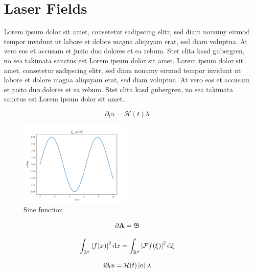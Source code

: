 \section{Laser Fields}
Lorem ipsum dolor sit amet, consetetur sadipscing elitr, sed diam nonumy eirmod tempor invidunt ut labore et dolore magna aliquyam erat, sed diam voluptua. At vero eos et accusam et justo duo dolores et ea rebum. Stet clita kasd gubergren, no sea takimata sanctus est Lorem ipsum dolor sit amet. Lorem ipsum dolor sit amet, consetetur sadipscing elitr, sed diam nonumy eirmod tempor invidunt ut labore et dolore magna aliquyam erat, sed diam voluptua. At vero eos et accusam et justo duo dolores et ea rebum. Stet clita kasd gubergren, no sea takimata sanctus est Lorem ipsum dolor sit amet.


\begin{equation}
    \partial_t u = \mathcal{H}(t)  \lambda 
\end{equation}

\begin{figure}[H]
    \centering
    \includegraphics[width=0.5\textwidth]{figures/plot.pdf}
    \caption{Sine function}
    \label{fig:sinus}
\end{figure}



\begin{equation*}
    \partial \mathbf{A} = \mathfrak{B}
\end{equation*}

\medskip

\begin{equation}
    \int_{\mathbb{R}^d} {\left\vert f(x)\right\vert}^2 \, \mathrm{d} x = \int_{\mathbb{R}^d} {\left\vert\mathcal{F} f(\xi)\right\vert}^2 \, \mathrm{d} \xi
\end{equation}

\medskip

\begin{equation}
    \mathrm{i} \partial_t u = \mathcal{H}(t) \Ket{a} \lambda 
\end{equation}

